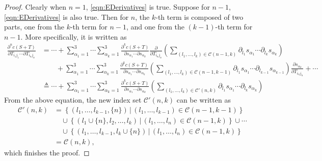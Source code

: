 \documentclass[10pt]{article}
\begin{document}
\begin{proof}
	Clearly when $n=1$, \eqref{eqn:EDerivatives} is true.
	Suppose for $n-1$, \eqref{eqn:EDerivatives} is also true.
	Then for $n$, the $k$-th term is composed of two parts, one from the $k$-th term for $n-1$, and one from the $(k-1)$-th term for $n-1$.
	More specifically, it is written as
	\begin{align}
		\frac{\partial^n c(S+T)}{\partial T_{i_1j_1} \cdots \partial T_{i_nj_n}} &= \cdots + \sum_{\alpha_1=1}^{3}\cdots\sum_{\alpha_k=1}^{3} \frac{\partial^k c(S+T)}{\partial s_{\alpha_1} \cdots \partial s_{\alpha_k}} \frac{\partial}{\partial T_{i_nj_n}}\left( \sum_{(l_1,\ldots,l_k)\in\mathcal{C}(n-1,k)} \partial_{l_1}s_{\alpha_1} \cdots \partial_{l_k}s_{\alpha_k} \right) \nonumber \\
		&\qquad + \sum_{\alpha_1=1}^{3}\cdots\sum_{\alpha_k=1}^{3} \frac{\partial^k c(S+T)}{\partial s_{\alpha_1} \cdots \partial s_{\alpha_k}} \left( \sum_{(l_1,\ldots,l_k)\in\mathcal{C}(n-1,k-1)} \partial_{l_1}s_{\alpha_1} \cdots \partial_{l_{k-1}}s_{\alpha_{k-1}} \right) \frac{\partial s_{\alpha_k}}{\partial T_{i_nj_n}} + \cdots \nonumber \\
		&\triangleq \cdots + \sum_{\alpha_1=1}^{3}\cdots\sum_{\alpha_k=1}^{3} \frac{\partial^k c(S+T)}{\partial s_{\alpha_1} \cdots \partial s_{\alpha_k}} \left( \sum_{(l_1,\ldots,l_k)\in\mathcal{C}'(n,k)} \partial_{l_1}s_{\alpha_1} \cdots \partial_{l_{k}}s_{\alpha_{k}} \right)
	\end{align}
	From the above equation, the new index set $\mathcal{C}'(n,k)$ can be written as
	\begin{align}
		\mathcal{C}'(n,k) &= \left\{ (l_1,\ldots,l_{k-1},\{n\}) \,|\, (l_1,\ldots,l_{k-1})\in\mathcal{C}(n-1,k-1) \right\} \nonumber \\
		&\quad \cup \left\{ (l_1\cup\{n\},l_2,\ldots,l_k) \,|\, (l_1,\ldots,l_n)\in\mathcal{C}(n-1,k) \right\} \cup \cdots \nonumber \\
		&\quad \cup \left\{ (l_1,\ldots,l_{k-1},l_k\cup\{n\}) \,|\, (l_1,\ldots,l_n)\in\mathcal{C}(n-1,k) \right\} \nonumber \\
		&= \mathcal{C}(n,k),
	\end{align}
	which finishes the proof.
\end{proof}
\end{document}
